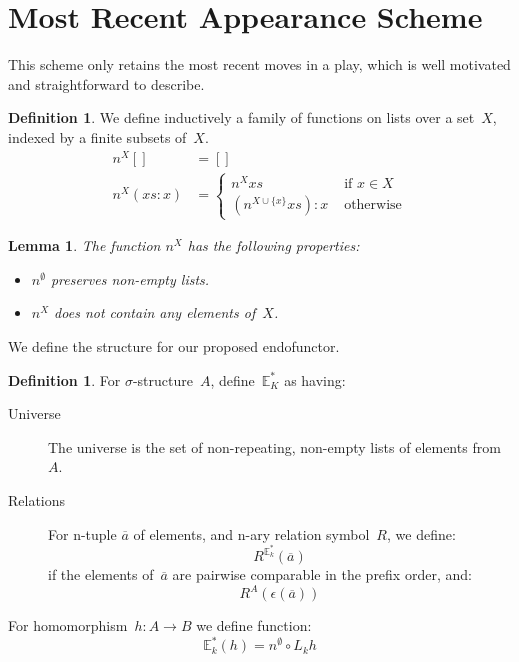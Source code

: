 \documentclass{article}
\theoremstyle{plain}
\newtheorem{lemma}[theorem]{Lemma}
\theoremstyle{definition}
\newtheorem{definition}[theorem]{Definition}
\theoremstyle{remark}
\numberwithin{theorem}{section}
\begin{document}
\section{Most Recent Appearance Scheme}
\label{sec:-most-recent-appearance}
This scheme only retains the most recent moves in a play, which is well motivated and straightforward to describe.
\begin{definition}
We define inductively a family of functions on lists over a set~$X$, indexed by a finite subsets of~$X$.
\begin{align*}
    n^X [] &= []\\
    n^X (xs:x) &= 
    \begin{cases}
    n^X xs &\mbox{ if } x \in X\\
    (n^{X \cup \{ x \} }xs) : x &\mbox{ otherwise}
    \end{cases}
\end{align*}
\end{definition}
\begin{lemma}
The function $n^X$ has the following properties:
\begin{itemize}
    \item $n^\emptyset$ preserves non-empty lists.
    \item $n^X$ does not contain any elements of~$X$.
\end{itemize}
\end{lemma}
We define the structure for our proposed endofunctor.
\begin{definition}
For $\sigma$-structure~$A$, define~$\mathbb{E}^*_K$ as having:
\begin{description}
\item[Universe] The universe is the set of non-repeating, non-empty lists of elements from~$A$.
\item[Relations] For n-tuple $\overline{a}$ of elements, and n-ary relation symbol~$R$, we define:
\begin{equation*}
    R^{\mathbb{E}^*_k}(\overline{a})
\end{equation*}
if the elements of~$\overline{a}$ are pairwise comparable in the prefix order, and:
\begin{equation*}
    R^A(\epsilon(\overline{a}))
\end{equation*}
\end{description}
For homomorphism~$h : A \rightarrow B$ we define function:
\begin{equation*}
    \mathbb{E}^*_k(h) = n^\emptyset \circ L_k h
\end{equation*}
\end{definition}
\end{document}
